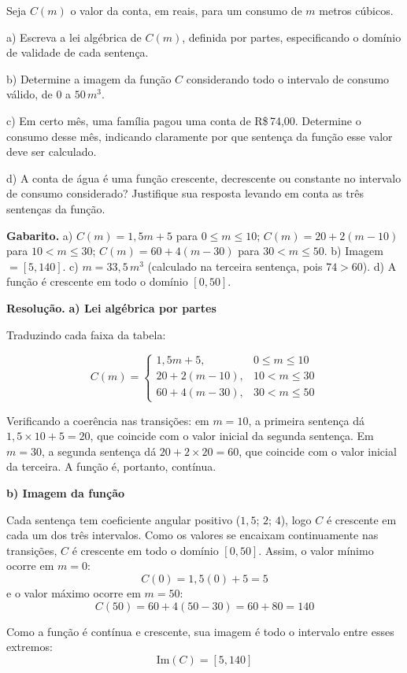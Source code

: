 \documentclass[11pt,a4paper]{article}
\begin{document}
Seja $C(m)$ o valor da conta, em reais, para um consumo de $m$ metros cúbicos.

a) Escreva a lei algébrica de $C(m)$, definida por partes, especificando o domínio de validade de cada sentença.

b) Determine a imagem da função $C$ considerando todo o intervalo de consumo válido, de $0$ a $50\,m^3$.

c) Em certo mês, uma família pagou uma conta de R\$\,74,00. Determine o consumo desse mês, indicando claramente por que sentença da função esse valor deve ser calculado.

d) A conta de água é uma função crescente, decrescente ou constante no intervalo de consumo considerado? Justifique sua resposta levando em conta as três sentenças da função.

\textbf{Gabarito.} a) $C(m) = 1{,}5m+5$ para $0\le m\le10$; $C(m)=20+2(m-10)$ para $10<m\le30$; $C(m)=60+4(m-30)$ para $30<m\le50$. b) Imagem $=[5,140]$. c) $m=33{,}5\,m^3$ (calculado na terceira sentença, pois $74>60$). d) A função é crescente em todo o domínio $[0,50]$.

\textbf{Resolução.} \textbf{a) Lei algébrica por partes}

Traduzindo cada faixa da tabela:

$$C(m) = \begin{cases} 1{,}5m + 5, & 0 \le m \le 10 \\ 20 + 2(m-10), & 10 < m \le 30 \\ 60 + 4(m-30), & 30 < m \le 50 \end{cases}$$

Verificando a coerência nas transições: em $m=10$, a primeira sentença dá $1{,}5\times10+5=20$, que coincide com o valor inicial da segunda sentença. Em $m=30$, a segunda sentença dá $20+2\times20=60$, que coincide com o valor inicial da terceira. A função é, portanto, contínua.

\textbf{b) Imagem da função}

Cada sentença tem coeficiente angular positivo ($1{,}5$; $2$; $4$), logo $C$ é crescente em cada um dos três intervalos. Como os valores se encaixam continuamente nas transições, $C$ é crescente em todo o domínio $[0,50]$. Assim, o valor mínimo ocorre em $m=0$:
$$C(0) = 1{,}5(0)+5 = 5$$
e o valor máximo ocorre em $m=50$:
$$C(50) = 60+4(50-30) = 60+80 = 140$$

Como a função é contínua e crescente, sua imagem é todo o intervalo entre esses extremos:
$$\text{Im}(C) = [5, 140]$$
\end{document}
